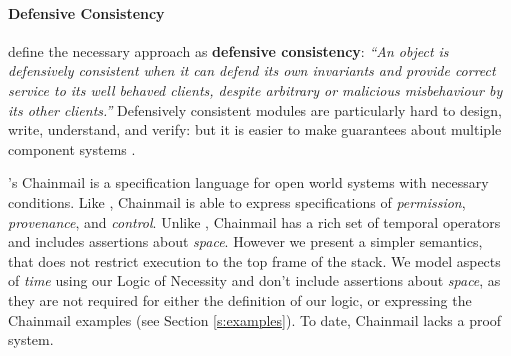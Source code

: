 
\paragraph{Defensive Consistency}



\cite{miller-esop2013,MillerPhD} define the necessary approach
as \textbf{defensive consistency}: \textit{``An object is defensively
  consistent when it can defend its own invariants and provide correct
  service to its well behaved clients, despite arbitrary or malicious
  misbehaviour by its other clients.''}  Defensively consistent
modules are particularly hard to design, write, understand, and
verify: but
it is easier to make guarantees about multiple component systems
\cite{Murray10dphil}.

\cite{FASE}'s Chainmail is a specification language for open world systems with necessary conditions.
Like \Chainmail, Chainmail is able to express specifications of \emph{permission}, \emph{provenance}, and \emph{control}. Unlike \Chainmail, Chainmail  has a rich set of temporal operators and  includes assertions about \emph{space}. However we 
present a simpler semantics, that does not restrict execution to the top frame of the stack. 
We model aspects of \emph{time} 
using our Logic of Necessity and don't include assertions about \emph{space},  as they are not required for either the definition 
of our logic, or expressing the Chainmail examples (see Section \ref{s:examples}). 
To date, Chainmail lacks a proof system.


